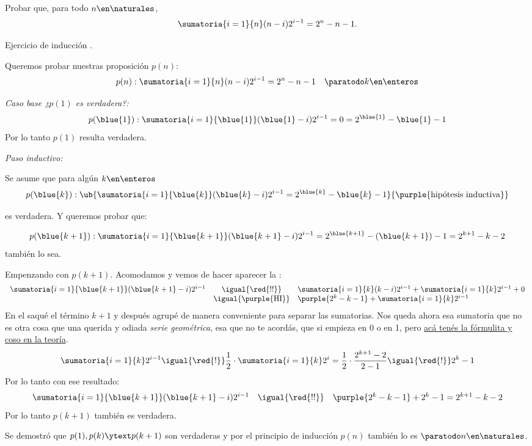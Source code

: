 \begin{enunciado}{\ejExtra}
  Probar que, para todo $n \en \naturales$,
  $$
    \sumatoria{i=1}{n}(n-i)2^{i-1} = 2^n -n -1.
  $$
\end{enunciado}
Ejercicio de inducción .

Queremos probar nuestras proposición $p(n)$:
$$
  p(n) : \sumatoria{i=1}{n}(n-i)2^{i-1} = 2^n - n -1 \quad \paratodo k \en \enteros
$$

\textit{Caso base  ¿$p(1)$ es verdadera?:}
$$
  p(\blue{1}) : \sumatoria{i=1}{\blue{1}}(\blue{1} - i)2^{i-1} = 0 =  2^{\blue{1}} - \blue{1} -1
$$
Por lo tanto $p(1)$ resulta verdadera.

\textit{Paso inductivo:}

Se asume que para algún $k\en \enteros$
$$
  p(\blue{k}) : \ub{
  \sumatoria{i=1}{\blue{k}}(\blue{k} - i)2^{i-1} =  2^{\blue{k}} - \blue{k} - 1
  }{\purple{\text{hipótesis inductiva}}}
$$

es verdadera. Y queremos probar que:

$$
  p(\blue{k+1}) : \sumatoria{i=1}{\blue{k+1}}(\blue{k+1}-i)2^{i-1} =  2^{\blue{k+1}} - (\blue{k+1}) - 1 = 2^{k+1} - k - 2
$$
también lo sea.

Empenzando con $p(k+1)$. Acomodamos y vemos de hacer aparecer la :
$$
  \begin{array}{rcl}
    \sumatoria{i=1}{\blue{k+1}}(\blue{k+1}-i)2^{i-1} & \igual{\red{!!}}           & \sumatoria{i=1}{k}(k-i)2^{i-1} + \sumatoria{i=1}{k} 2^{i-1} + 0 \\
                                                     & \igual{\purple{\text{HI}}} & \purple{2^k - k - 1} +  \sumatoria{i=1}{k} 2^{i-1}
  \end{array}
$$
En el \red{!!} saqué el término $k+1$ y después agrupé de manera conveniente para separar las sumatorias. Nos queda ahora esa sumatoria que no es
otra cosa que una querida y odiada \textit{serie geométrica}, esa que no te acordás, que si empieza en 0 o en 1,
pero \hyperlink{2-teoria:geometrica}{acá tenés la fórmulita y coso en la teoría}.
$$
  \sumatoria{i=1}{k} 2^{i-1} \igual{\red{!}}
  \frac{1}{2} \cdot \sumatoria{i=1}{k} 2^i =
  \frac{1}{2} \cdot \frac{2^{k+1} - 2}{2 - 1}
  \igual{\red{!}}
  2^k - 1
$$
Por lo tanto con ese resultado:
$$
  \begin{array}{rcl}
    \sumatoria{i=1}{\blue{k+1}}(\blue{k+1}-i)2^{i-1} & \igual{\red{!!}} & \purple{2^k - k - 1} + 2^k - 1 =  2^{k+1} - k - 2
  \end{array}
$$
Por lo tanto $p(k+1)$ también es verdadera.

\bigskip

Se demostró que $p(1), p(k) \ytext p(k+1)$ son verdaderas y por el principio de inducción $p(n)$ también lo es $\paratodo n \en \naturales$.


\begin{aportes}
  \item {}
  \item {}
\end{aportes}
